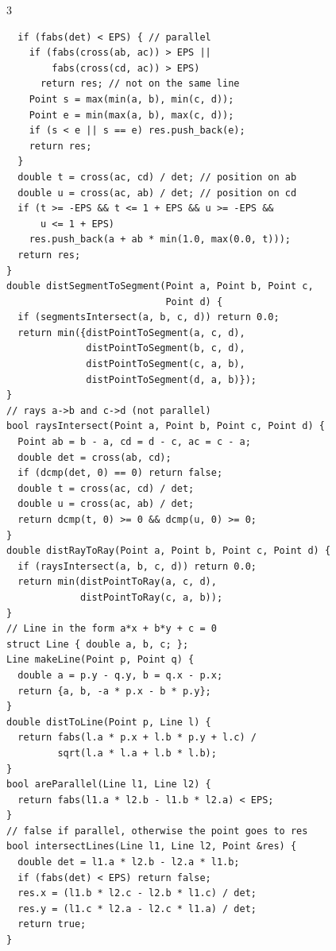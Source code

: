 \documentclass[8pt, a4paper]{article}
\begin{document}
\begin{multicols*}{3}
\begin{lstlisting}
  if (fabs(det) < EPS) { // parallel
    if (fabs(cross(ab, ac)) > EPS ||
        fabs(cross(cd, ac)) > EPS)
      return res; // not on the same line
    Point s = max(min(a, b), min(c, d));
    Point e = min(max(a, b), max(c, d));
    if (s < e || s == e) res.push_back(e);
    return res;
  }
  double t = cross(ac, cd) / det; // position on ab
  double u = cross(ac, ab) / det; // position on cd
  if (t >= -EPS && t <= 1 + EPS && u >= -EPS &&
      u <= 1 + EPS)
    res.push_back(a + ab * min(1.0, max(0.0, t)));
  return res;
}
double distSegmentToSegment(Point a, Point b, Point c,
                            Point d) {
  if (segmentsIntersect(a, b, c, d)) return 0.0;
  return min({distPointToSegment(a, c, d),
              distPointToSegment(b, c, d),
              distPointToSegment(c, a, b),
              distPointToSegment(d, a, b)});
}
// rays a->b and c->d (not parallel)
bool raysIntersect(Point a, Point b, Point c, Point d) {
  Point ab = b - a, cd = d - c, ac = c - a;
  double det = cross(ab, cd);
  if (dcmp(det, 0) == 0) return false;
  double t = cross(ac, cd) / det;
  double u = cross(ac, ab) / det;
  return dcmp(t, 0) >= 0 && dcmp(u, 0) >= 0;
}
double distRayToRay(Point a, Point b, Point c, Point d) {
  if (raysIntersect(a, b, c, d)) return 0.0;
  return min(distPointToRay(a, c, d),
             distPointToRay(c, a, b));
}
// Line in the form a*x + b*y + c = 0
struct Line { double a, b, c; };
Line makeLine(Point p, Point q) {
  double a = p.y - q.y, b = q.x - p.x;
  return {a, b, -a * p.x - b * p.y};
}
double distToLine(Point p, Line l) {
  return fabs(l.a * p.x + l.b * p.y + l.c) /
         sqrt(l.a * l.a + l.b * l.b);
}
bool areParallel(Line l1, Line l2) {
  return fabs(l1.a * l2.b - l1.b * l2.a) < EPS;
}
// false if parallel, otherwise the point goes to res
bool intersectLines(Line l1, Line l2, Point &res) {
  double det = l1.a * l2.b - l2.a * l1.b;
  if (fabs(det) < EPS) return false;
  res.x = (l1.b * l2.c - l2.b * l1.c) / det;
  res.y = (l1.c * l2.a - l2.c * l1.a) / det;
  return true;
}
\end{lstlisting}

\end{multicols*}
\end{document}
